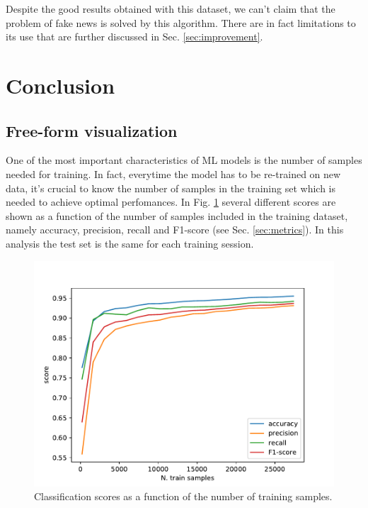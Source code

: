 \documentclass[a4paper,12pt]{article} %
\begin{document}
Despite the good results obtained with this dataset,
we can't claim that the problem of fake news is solved by this algorithm.
There are in fact limitations to its use that are further discussed
in Sec. \ref{sec:improvement}.



\section{Conclusion}

\subsection{Free-form visualization}
One of the most important characteristics of ML models is the number
of samples needed for training.
In fact, everytime the model has to be re-trained on new data, it's crucial to know
the number of samples in the training set which is needed to achieve optimal perfomances.
In Fig. \ref{fig:scores_vs_nsamples} several different scores are shown as a function
of the number of samples included in the training dataset, namely accuracy, precision, recall and F1-score
(see Sec. \ref{sec:metrics}).
In this analysis the test set is the same for each training session.
\begin{figure}[h!]
\caption{Classification scores as a function of the number of training samples. \label{fig:scores_vs_nsamples}}
\begin{center}
\includegraphics[scale=0.8]{plots/scores_vs_nsamples.pdf}
\end{center}
\end{figure}
\end{document}
